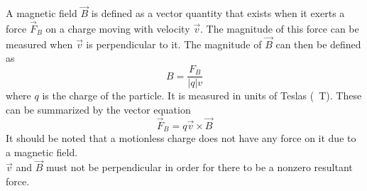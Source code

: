 \documentclass{subfiles}
\begin{document}
	A magnetic field \(\vec{B}\) is defined as a vector quantity that exists when it exerts a force \(\vec{F}_B\) on a charge moving with velocity \(\vec{v}\). The magnitude of this force can be measured when \(\vec{v}\) is perpendicular to it. The magnitude of \(\vec{B}\) can then be defined as
		\[B = \frac{F_B}{|q|v}\]
		where \(q\) is the charge of the particle. It is measured in units of Teslas (\SI{}{T}).
		These can be summarized by the vector equation
		\[\vec{F}_B = q\vec{v} \times \vec{B}\]
		It should be noted that a motionless charge does not have any force on it due to a magnetic field. \\
		\(\vec{v}\) and \(\vec{B}\) must not be perpendicular in order for there to be a nonzero resultant force.
\end{document}
